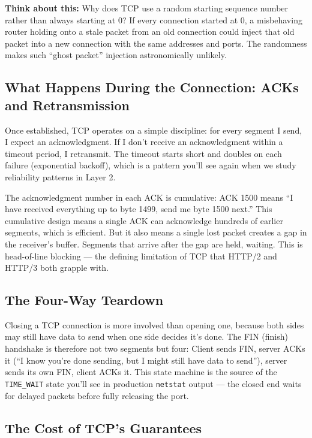 \documentclass[11pt,a4paper]{article}
\begin{document}
\begin{thinkbox}
\textbf{Think about this:} Why does TCP use a random starting sequence number rather than always starting at 0? If every connection started at 0, a misbehaving router holding onto a stale packet from an old connection could inject that old packet into a new connection with the same addresses and ports. The randomness makes such ``ghost packet'' injection astronomically unlikely.
\end{thinkbox}

\subsection{What Happens During the Connection: ACKs and Retransmission}

Once established, TCP operates on a simple discipline: for every segment I send, I expect an acknowledgment. If I don't receive an acknowledgment within a timeout period, I retransmit. The timeout starts short and doubles on each failure (exponential backoff), which is a pattern you'll see again when we study reliability patterns in Layer 2.

The acknowledgment number in each ACK is cumulative: ACK 1500 means ``I have received everything up to byte 1499, send me byte 1500 next.'' This cumulative design means a single ACK can acknowledge hundreds of earlier segments, which is efficient. But it also means a single lost packet creates a gap in the receiver's buffer. Segments that arrive after the gap are held, waiting. This is head-of-line blocking --- the defining limitation of TCP that HTTP/2 and HTTP/3 both grapple with.

\subsection{The Four-Way Teardown}

Closing a TCP connection is more involved than opening one, because both sides may still have data to send when one side decides it's done. The FIN (finish) handshake is therefore not two segments but four: Client sends FIN, server ACKs it (``I know you're done sending, but I might still have data to send''), server sends its own FIN, client ACKs it. This state machine is the source of the \texttt{TIME\_WAIT} state you'll see in production \texttt{netstat} output --- the closed end waits for delayed packets before fully releasing the port.

\subsection{The Cost of TCP's Guarantees}
\end{document}
